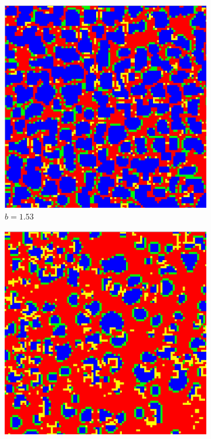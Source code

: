 \documentclass[12pt]{article}
\begin{document}
\begin{figure}[!htbp]
        \begin{subfigure}{.33\textwidth}
          \centering
          \includegraphics[width=.9\linewidth]{MeanFieldGame/snapshot_b=153.jpg}
          \caption{$b=1.53$}
          \label{fig:sub4}
        \end{subfigure}%
        \begin{subfigure}{.33\textwidth}
          \centering
          \includegraphics[width=.9\linewidth]{MeanFieldGame/snapshot_b=157.jpg}

\end{subfigure}
\end{figure}
\end{document}
